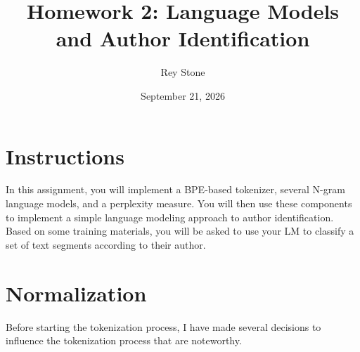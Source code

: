 \documentclass[11pt]{article}
\title{Homework 2: Language Models and Author Identification}
\date{September 21, 2026}
\author{Rey Stone}
\begin{document}
\maketitle

\section{Instructions}
In this assignment, you will implement a BPE-based tokenizer, several N-gram language models, and a perplexity measure.  You will then use these components to implement a simple language modeling approach to author identification.  Based on some training materials, you will be asked to use your LM to classify a set of text segments according to their author.

\section{Normalization}

Before starting the tokenization process, I have made several decisions to influence the tokenization process that are noteworthy.
\end{document}
